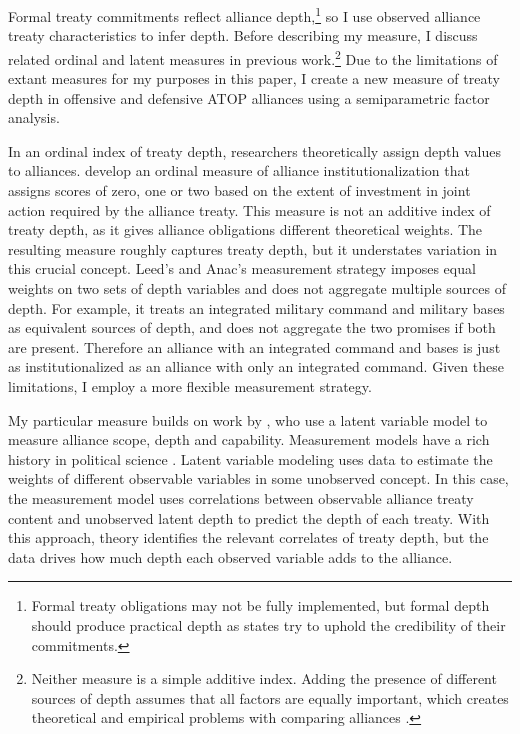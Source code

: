 \documentclass[12pt]{article}
\begin{document}
Formal treaty commitments reflect alliance depth,\footnote{Formal treaty obligations may not be fully implemented, but formal depth should produce practical depth as states try to uphold the credibility of their commitments.} so I use observed alliance treaty characteristics to infer depth. 
Before describing my measure, I discuss related ordinal and latent measures in previous work.\footnote{Neither measure is a simple additive index. Adding the presence of different sources of depth assumes that all factors are equally important, which creates theoretical and empirical problems with comparing alliances \citep[pg. 876]{BensonClinton2016}.} 
Due to the limitations of extant measures for my purposes in this paper, I create a new measure of treaty depth in offensive and defensive ATOP alliances using a semiparametric factor analysis. 


In an ordinal index of treaty depth, researchers theoretically assign depth values to alliances. 
\citep{LeedsAnac2005} develop an ordinal measure of alliance institutionalization that assigns scores of zero, one or two based on the extent of investment in joint action required by the alliance treaty. 
This measure is not an additive index of treaty depth, as it gives alliance obligations different theoretical weights.  
The resulting measure roughly captures treaty depth, but it understates variation in this crucial concept. 
Leed's and Anac's measurement strategy imposes equal weights on two sets of depth variables and does not aggregate multiple sources of depth. 
For example, it treats an integrated military command and military bases as equivalent sources of depth, and does not aggregate the two promises if both are present. 
Therefore an alliance with an integrated command and bases is just as institutionalized as an alliance with only an integrated command. 
Given these limitations, I employ a more flexible measurement strategy.


My particular measure builds on work by \citet{BensonClinton2016}, who use a latent variable model to measure alliance scope, depth and capability.  
Measurement models have a rich history in political science \citep{Clintonetal2004, Fariss2014}.
Latent variable modeling uses data to estimate the weights of different observable variables in some unobserved concept. 
In this case, the measurement model uses correlations between observable alliance treaty content and unobserved latent depth to predict the depth of each treaty. 
With this approach, theory identifies the relevant correlates of treaty depth, but the data drives how much depth each observed variable adds to the alliance.
\end{document}
